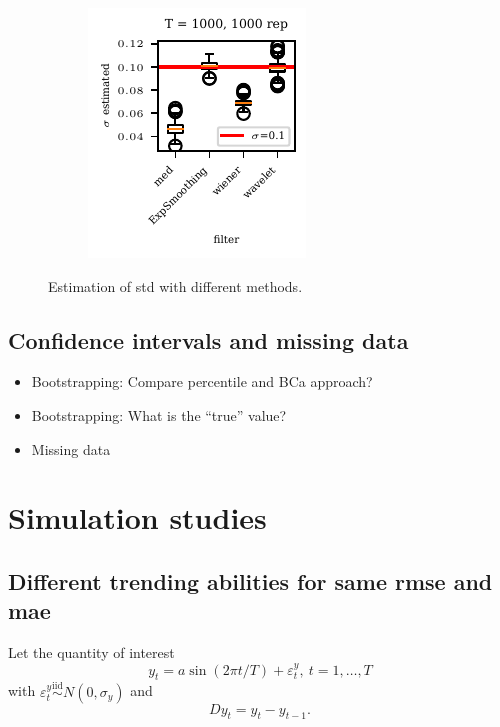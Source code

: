 \documentclass[oneside]{article}
\theoremstyle{plain}%
\theoremstyle{definition}
\newcommand{\ydiff}{D y}
\begin{document}
\begin{figure}
    \begin{subfigure}{0.24\textwidth}
        \includegraphics{plots/std estimation/std_estimation_boxplot_1000.pdf}
    \end{subfigure}
  \caption{Estimation of std with different methods.}
  \label{fig:estimation std}
\end{figure}


\subsection{Confidence intervals and missing data}


\begin{itemize}
  \item Bootstrapping: Compare percentile and BCa approach?
  \item Bootstrapping: What is the \enquote{true} value?
  \item Missing data
\end{itemize}


\section{Simulation studies}

\subsection{Different trending abilities for same rmse and mae} \label{sec:simulation_rmse_mae}

Let the quantity of interest 
\begin{equation}\label{eq: simulation}
  y_t = a \sin(2 \pi t / T) + \varepsilon_t^y, \ t = 1, \dots, T
\end{equation}
with $\varepsilon_t^y \stackrel{\text{iid}}{\sim} N(0, \sigma_y)$ and 
\begin{equation}
  \ydiff_t = y_t - y_{t-1}.
\end{equation}
\end{document}
